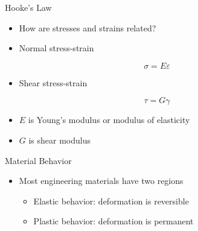 \documentclass[10pt, svgnames]{beamer}
\begin{document}
\begin{frame}[label={sec:org950226d}]{Hooke's Law}
\begin{itemize}
\item How are stresses and strains related?

\item Normal stress-strain
\end{itemize}

\[\sigma = E \varepsilon\]

\begin{itemize}
\item Shear stress-strain
\end{itemize}

\[\tau = G \gamma\]

\begin{itemize}
\item \(E\) is Young's modulus or modulus of elasticity

\item \(G\) is shear modulus
\end{itemize}
\end{frame}

\begin{frame}[label={sec:orgb4a73dd}]{Material Behavior}
\begin{itemize}
\item Most engineering materials have two regions

\begin{itemize}
\item Elastic behavior: deformation is reversible

\item Plastic behavior: deformation is permanent
\end{itemize}
\end{itemize}
\end{frame}
\end{document}

